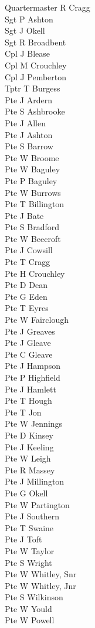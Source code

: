 \begin{multicols}{2}
  \noindent
  Quartermaster R Cragg \\
  Sgt P Ashton \\
  Sgt J Okell \\
  Sgt R Broadbent \\
  Cpl J Blease \\
  Cpl M Crouchley \\
  Cpl J Pemberton \\
  Tptr T Burgess \\
  Pte J Ardern \\
  Pte S Ashbrooke \\
  Pte J Allen \\
  Pte J Ashton \\
  Pte S Barrow \\
  Pte W Broome \\
  Pte W Baguley \\
  Pte P Baguley \\
  Pte W Burrows \\
  Pte T Billington \\
  Pte J Bate \\
  Pte S Bradford \\
  Pte W Beecroft \\
  Pte J Cowsill \\
  Pte T Cragg \\
  Pte H Crouchley \\
  Pte D Dean \\
  Pte G Eden \\
  Pte T Eyres \\
  Pte W Fairclough \\
  Pte J Greaves \\
  Pte J Gleave \\
  Pte C Gleave \\
  Pte J Hampson \\
  Pte P Highfield \\
  Pte J Hamlett \\
  Pte T Hough \\
  Pte T Jon \\
  Pte W Jennings \\
  Pte D Kinsey \\
  Pte J Keeling \\
  Pte W Leigh \\
  Pte R Massey \\
  Pte J Millington \\
  Pte G Okell \\
  Pte W Partington \\
  Pte J Southern \\
  Pte T Swaine \\
  Pte J Toft \\
  Pte W Taylor \\
  Pte S Wright \\
  Pte W Whitley, Snr \\
  Pte W Whitley, Jnr \\
  Pte S Wilkinson \\
  Pte W Yould \\
  Pte W Powell \\
\end{multicols}

